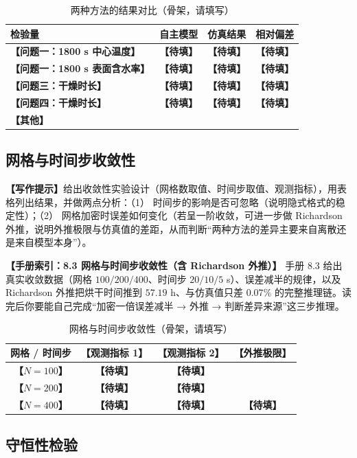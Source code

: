 \documentclass[12pt,a4paper]{article}
\newcommand{\prompt}[1]{\par\noindent\textbf{【写作提示】}#1\par}      %
\newcommand{\ph}[1]{\textbf{【#1】}}                                   %
\newcommand{\handbook}[2]{\par\noindent\textbf{【手册索引：#1】} #2\par}
\begin{document}
\begin{table}[H]
\centering
\caption{两种方法的结果对比（骨架，请填写）}
\label{tab:verify-comsol}
\begin{tabular}{p{5.0cm}ccc}
\toprule
检验量 & 自主模型 & 仿真结果 & 相对偏差\\
\midrule
\ph{问题一：1800 s 中心温度} & \ph{待填} & \ph{待填} & \ph{待填}\\
\ph{问题一：1800 s 表面含水率} & \ph{待填} & \ph{待填} & \ph{待填}\\
\ph{问题三：干燥时长} & \ph{待填} & \ph{待填} & \ph{待填}\\
\ph{问题四：干燥时长} & \ph{待填} & \ph{待填} & \ph{待填}\\
\ph{其他} & & & \\
\bottomrule
\end{tabular}
\end{table}

\subsection{网格与时间步收敛性}

\prompt{给出收敛性实验设计（网格数取值、时间步取值、观测指标），用表格列出结果，并做两点分析：（1） 时间步的影响是否可忽略（说明隐式格式的稳定性）；（2） 网格加密时误差如何变化（若呈一阶收敛，可进一步做 Richardson 外推，说明外推极限与仿真值的差距，从而判断“两种方法的差异主要来自离散还是来自模型本身”）。}

\handbook{8.3 网格与时间步收敛性（含 Richardson 外推）}{手册 8.3 给出真实收敛数据（网格 $100/200/400$、时间步 $20/10/5$ s）、误差减半的规律，以及 Richardson 外推把烘干时间推到 $57.19$ h、与仿真值只差 $0.07\%$ 的完整推理链。读完后你要能自己完成“加密一倍误差减半 → 外推 → 判断差异来源”这三步推理。}

\begin{table}[H]
\centering
\caption{网格与时间步收敛性（骨架，请填写）}
\label{tab:convergence}
\begin{tabular}{cccc}
\toprule
网格 / 时间步 & \ph{观测指标 1} & \ph{观测指标 2} & \ph{外推极限}\\
\midrule
\ph{$N=100$} & \ph{待填} & \ph{待填} & \\
\ph{$N=200$} & \ph{待填} & \ph{待填} & \\
\ph{$N=400$} & \ph{待填} & \ph{待填} & \ph{待填}\\
\bottomrule
\end{tabular}
\end{table}

\subsection{守恒性检验}
\end{document}
